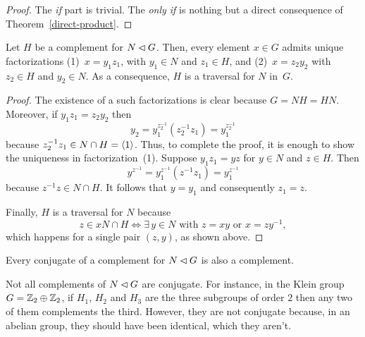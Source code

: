 \begin{proof} The \textit{if\/} part is trivial. The \textit{only if\/} is nothing but a direct consequence of Theorem~\ref{direct-product}.  \end{proof}

\begin{prop}\label{split-element}
    Let\/ $H$ be a complement for $N\lhd G$. Then, every element\/ $x\in G$ admits unique factorizations\/ {\rm (1)}~$x=y_1z_1$, with\/ $y_1\in N$ and\/ $z_1\in H$, and {\rm (2)}~$x=z_2y_2$ with\/ $z_2\in H$ and\/ $y_2\in N$. As a consequence, $H$ is a traversal for\/ $N$ in\/~$G$. 
\end{prop}

\begin{proof} The existence of a such factorizations is clear because $G=NH=HN$. Moreover, if $y_1z_1=z_2y_2$ then
$$
    y_2=y_1^{z_2^{-1}}(z_2^{-1}z_1)=y_1^{z_2^{-1}}
$$
because $z_2^{-1}z_1\in N\cap H=\langle1\rangle$. Thus, to complete the proof, it is enough to show the uniqueness in factorization~(1). Suppose $y_1z_1=yz$ for $y\in N$ and $z\in H$. Then
$$
    y^{z^{-1}} = y_1^{z^{-1}}(z^{-1}z_1)= y_1^{z^{-1}}
$$
because $z^{-1}z\in N\cap H$. It follows that $y=y_1$ and consequently $z_1=z$.

Finally, $H$ is a traversal for $N$ because
$$
    z\in xN\cap H \iff \exists\, y\in N \text{ with }z=xy
        \text{ or } x=zy^{-1},
$$
which happens for a single pair $(z,y)$, as shown above.  \end{proof}

\begin{rem}
    Every conjugate of a complement for $N\lhd G$ is also a complement.
\end{rem}

\begin{xmpl}
    Not all complements of\/ $N\lhd G$ are conjugate. For instance, in the Klein group\/ $G=\mathbb{Z}_2\oplus\mathbb{Z}_2$, if $H_1$, $H_2$ and $H_3$ are the three subgroups of order $2$ then any two of them complements the third. However, they are not conjugate because, in an abelian group, they should have been identical, which they aren't. 
\end{xmpl}

